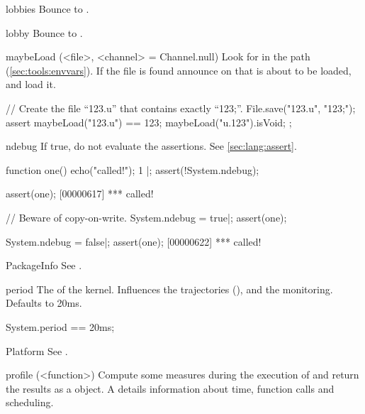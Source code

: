 \begin{urbiscriptapi}
\item[lobbies] Bounce to .


\item[lobby] Bounce to .


\item[maybeLoad](<file>, <channel> = Channel.null)%
  Look for  in the \urbi path (\autoref{sec:tools:envvars}).
  If the file is found announce on  that  is
  about to be loaded, and load it.

\begin{urbiscript}
// Create the file ``123.u'' that contains exactly ``123;''.
File.save("123.u", "123;");
assert
{
  maybeLoad("123.u") == 123;
  maybeLoad("u.123").isVoid;
};
\end{urbiscript}


\item[ndebug] If true, do not evaluate the assertions.  See
  \autoref{sec:lang:assert}.
\begin{urbiscript}
function one() { echo("called!"); 1 }|;
assert(!System.ndebug);

assert(one);
[00000617] *** called!

// Beware of copy-on-write.
System.ndebug = true|;
assert(one);

System.ndebug = false|;
assert(one);
[00000622] *** called!
\end{urbiscript}




\item[PackageInfo] See .


\item[period] The  of the \urbi kernel.  Influences the
  trajectories (), and the \UObject
  monitoring.  Defaults to 20ms.
\begin{urbiassert}
System.period == 20ms;
\end{urbiassert}


\item[Platform] See .


\item[profile](<function>)%
  Compute some measures during the execution of  and return
  the results as a  object. A  details
  information about time, function calls and scheduling.



\end{urbiscriptapi}
